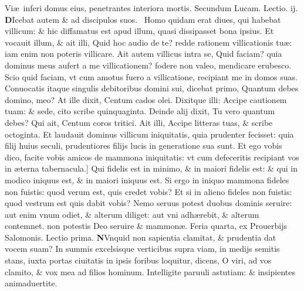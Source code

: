 \documentclass[a5paper,10pt]{book}
\def\leftmarginnote{%
	\lrmarginnote{\hskip -\marginparsep \hskip -6.5em}}
\def\rightmarginnote{%
	\lrmarginnote{\hskip\columnwidth \hskip -1em}}
\def\ae{æ}
\begin{document}
\begin{multicols*}{2}
Vi\ae \ inferi domus eius, penetrantes interiora mortis.
\newline \color{red} Secundum Lucam. \hfill Lectio. ij. \color{black}
\vspace{-.25em}
\lettrine[lines=2]{\bfseries \color{red} D}{}Icebat\leftmarginnote{\begin{flushright}c. 16.\\a\end{flushright}} autem \& ad discipulos suos. \textdagger \ 
Homo quidam erat diues, qui habebat villicum: \& hic diffamatus est apud illum, quasi dissipasset bona ipsius.
Et vocauit illum, \& ait illi, Quid hoc audio de te? redde rationem villicationis tu\ae : iam enim non poteris villicare.
Ait autem villicus intra se, Quid faciam? quia dominus meus aufert a me villicationem? fodere non valeo, mendicare erubesco.
Scio quid faciam, vt cum amotus fuero a villicatione, recipiant me in domos suas.
Conuocatis itaque singulis debitoribus domini sui, dicebat primo, Quantum debes domino, meo?
At ille dixit, Centum cados olei. Dixitque illi: Accipe cautionem tuam: \& sede, cito scribe quinquaginta.
Deinde alij dixit, Tu vero quantum debes? Qui ait, Centum coros tritici.
Ait illi, Accipe litteras tuas, \& scribe octoginta. Et laudauit dominus villicum iniquitatis, quia prudenter fecisset: quia filij huius seculi, prudentiores filijs lucis in generatione sua sunt.
Et ego vobis dico, facite vobis amicos de mammona iniquitatis: vt cum defeceritis recipiant vos in \ae terna tabernacula.]
Qui\rightmarginnote{B} fidelis est in minimo, \& in maiori fidelis est: \& qui in modico iniquus est, \& in maiori iniquus est.
Si ergo in iniquo mammona fideles non fuistis: quod verum est, quis credet vobis? Et si in alieno fideles
non fuistis: quod vestrum est quis dabit vobis? Nemo seruus potest duobus dominis seruire: aut enim vnum odiet, \& alterum diliget: aut vni adh\ae rebit, \& alterum contemnet. non potestis Deo seruire \& mammon\ae .
\newline \textswab{C} \color{red} \hypertarget{WED-SECVNDA-POST-ADV}{Feria quarta,} ex Prouerbijs Salomonis. \hfill Lectio prima. \color{black}
\bookmark[dest=WED-SECVNDA-POST-ADV]{FERIA QVARTA}
\vspace{-2.25em}
\lettrine[lines=2]{\bfseries N}{}Vnquid\rightmarginnote{ca. 8.} non sapientia clamitat, \& prudentia dat vocem suam?
In summis excelsisque verticibus supra viam, in medijs semitis stans, iuxta portas ciuitatis in ipsis foribus loquitur, dicens, O viri, ad vos clamito, \& vox mea ad filios hominum.
Intelligite paruuli astutiam: \& insipientes animaduertite.

\end{multicols*}
\end{document}
